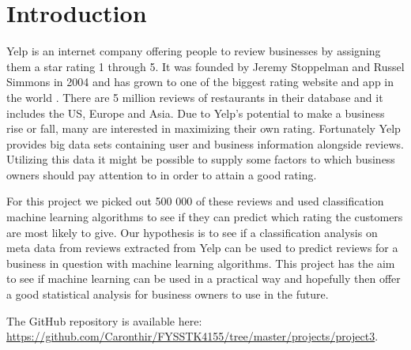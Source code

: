 \section{Introduction}
Yelp is an internet company offering people to review businesses by assigning them a star rating 1 through 5. It was founded by Jeremy Stoppelman and Russel Simmons in 2004 and has grown to one of the biggest rating website and app in the world \cite{yelp}. There are 5 million reviews of restaurants in their database and it includes the US, Europe and Asia. 
Due to Yelp's potential to make a business rise or fall, many are interested in maximizing their own rating. 
Fortunately Yelp provides big data sets containing user and business information alongside reviews. Utilizing this data
it might be possible to supply some factors to which business owners should pay attention to in order to attain a good rating.


For this project we picked out 500 000 of these reviews and used classification machine learning algorithms to see if they 
can predict which rating the customers are most likely to give. Our hypothesis is to see if a classification analysis on
meta data from reviews extracted from Yelp can be used to predict reviews for a business in question with machine learning
algorithms. This project has the aim to see if machine learning can be used in a practical way and hopefully then offer a good statistical analysis for business owners to use in the future. 


The GitHub repository is available here: \url{https://github.com/Caronthir/FYSSTK4155/tree/master/projects/project3}.
